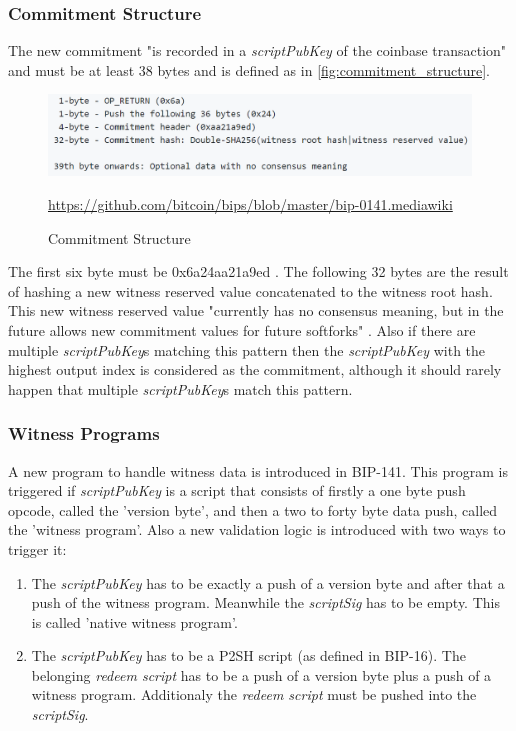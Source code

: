 \subsubsection{Commitment Structure}
\label{subsec:SegWit:Implementation:CommitmentStructure}
The new commitment "is recorded in a \textit{scriptPubKey} of the coinbase transaction" \cite{bip-141} and must be at least 38 bytes and is defined as in \autoref{fig:commitment_structure}.
\begin{figure}[!ht]
    \centering
    \includegraphics[width=(\textwidth * 2 / 3 )]{Ausarbeitung/images/CommitmentStructure.png}
    \caption[Commitment Structure]{Commitment Structure}
    \small \url{https://github.com/bitcoin/bips/blob/master/bip-0141.mediawiki} 
    \label{fig:commitment_structure}
\end{figure}
The first six byte must be 0x6a24aa21a9ed \cite{bip-141}. The following 32 bytes are the result of hashing a new witness reserved value concatenated to the witness root hash. This new witness reserved value "currently has no consensus meaning, but in the future allows new commitment values for future softforks" \cite{bip-141}. Also if there are multiple \textit{scriptPubKey}s matching this pattern then the \textit{scriptPubKey} with the highest output index is considered as the commitment, although it should rarely happen that multiple \textit{scriptPubKey}s match this pattern.


\subsubsection{Witness Programs}
\label{subsec:SegWit:Implementation:WitnessPrograms}
A new program to handle witness data is introduced in BIP-141. This program is triggered if \textit{scriptPubKey} is a script that consists of firstly a one byte push opcode, called the 'version byte', and then a two to forty byte data push, called the 'witness program'. Also a new validation logic is introduced with two ways to trigger it:
\begin{enumerate}
    \item The \textit{scriptPubKey} has to be exactly a push of a version byte and after that a push of the witness program. Meanwhile the \textit{scriptSig} has to be empty. This is called 'native witness program'.
    \item The \textit{scriptPubKey} has to be a P2SH script (as defined in BIP-16). The belonging \textit{redeem script} has to be a push of a version byte plus a push of a witness program. Additionaly the \textit{redeem script} must be pushed into the \textit{scriptSig}.
\end{enumerate}

